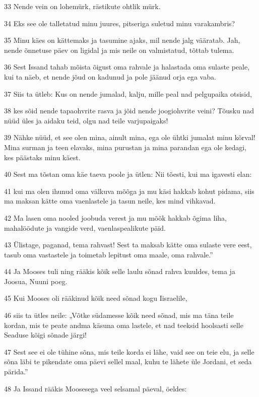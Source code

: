 \par 33 Nende vein on lohemürk, rästikute ohtlik mürk.
\par 34 Eks see ole talletatud minu juures, pitseriga suletud minu varakambris?
\par 35 Minu käes on kättemaks ja tasumine ajaks, mil nende jalg vääratab. Jah, nende õnnetuse päev on ligidal ja mis neile on valmistatud, tõttab tulema.
\par 36 Sest Issand tahab mõista õigust oma rahvale ja halastada oma sulaste peale, kui ta näeb, et nende jõud on kadunud ja pole jäänud orja ega vaba.
\par 37 Siis ta ütleb: Kus on nende jumalad, kalju, mille peal nad pelgupaika otsisid,
\par 38 kes sõid nende tapaohvrite rasva ja jõid nende joogiohvrite veini? Tõusku nad nüüd üles ja aidaku teid, olgu nad teile varjupaigaks!
\par 39 Nähke nüüd, et see olen mina, ainult mina, ega ole ühtki jumalat minu kõrval! Mina surman ja teen elavaks, mina purustan ja mina parandan ega ole kedagi, kes päästaks minu käest.
\par 40 Sest ma tõstan oma käe taeva poole ja ütlen: Nii tõesti, kui ma igavesti elan:
\par 41 kui ma olen ihunud oma välkuva mõõga ja mu käsi hakkab kohut pidama, siis ma maksan kätte oma vaenlastele ja tasun neile, kes mind vihkavad.
\par 42 Ma lasen oma nooled joobuda verest ja mu mõõk hakkab õgima liha, mahalöödute ja vangide verd, vaenlaspealikute päid.
\par 43 Ülistage, paganad, tema rahvast! Sest ta maksab kätte oma sulaste vere eest, tasub oma vastastele ja toimetab lepitust oma maale, oma rahvale.”
\par 44 Ja Mooses tuli ning rääkis kõik selle laulu sõnad rahva kuuldes, tema ja Joosua, Nuuni poeg.
\par 45 Kui Mooses oli rääkinud kõik need sõnad kogu Iisraelile,
\par 46 siis ta ütles neile: „Võtke südamesse kõik need sõnad, mis ma täna teile kordan, mis te peate andma käsuna oma lastele, et nad teeksid hoolsasti selle Seaduse kõigi sõnade järgi!
\par 47 Sest see ei ole tühine sõna, mis teile korda ei lähe, vaid see on teie elu, ja selle sõna läbi te pikendate oma päevi sellel maal, kuhu te lähete üle Jordani, et seda pärida.”
\par 48 Ja Issand rääkis Moosesega veel selsamal päeval, öeldes:

